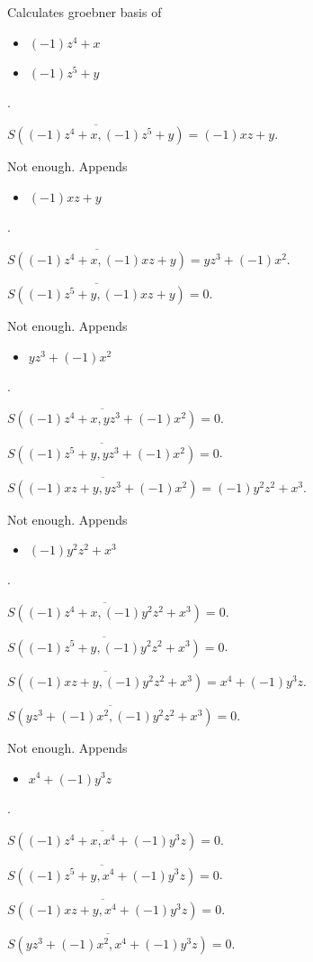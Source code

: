 Calculates groebner basis of 
\begin{itemize}
\item $(-1)z^{4}+x$
\item $(-1)z^{5}+y$
\end{itemize}  .


$\overline{S((-1)z^{4}+x, (-1)z^{5}+y)} = (-1)xz+y$.

Not enough.  Appends \begin{itemize}
\item $(-1)xz+y$
\end{itemize}  .


$\overline{S((-1)z^{4}+x, (-1)xz+y)} = yz^{3}+(-1)x^{2}$.

$\overline{S((-1)z^{5}+y, (-1)xz+y)} = 0$.

Not enough.  Appends \begin{itemize}
\item $yz^{3}+(-1)x^{2}$
\end{itemize}  .


$\overline{S((-1)z^{4}+x, yz^{3}+(-1)x^{2})} = 0$.

$\overline{S((-1)z^{5}+y, yz^{3}+(-1)x^{2})} = 0$.

$\overline{S((-1)xz+y, yz^{3}+(-1)x^{2})} = (-1)y^{2}z^{2}+x^{3}$.

Not enough.  Appends \begin{itemize}
\item $(-1)y^{2}z^{2}+x^{3}$
\end{itemize}  .


$\overline{S((-1)z^{4}+x, (-1)y^{2}z^{2}+x^{3})} = 0$.

$\overline{S((-1)z^{5}+y, (-1)y^{2}z^{2}+x^{3})} = 0$.

$\overline{S((-1)xz+y, (-1)y^{2}z^{2}+x^{3})} = x^{4}+(-1)y^{3}z$.

$\overline{S(yz^{3}+(-1)x^{2}, (-1)y^{2}z^{2}+x^{3})} = 0$.

Not enough.  Appends \begin{itemize}
\item $x^{4}+(-1)y^{3}z$
\end{itemize}  .


$\overline{S((-1)z^{4}+x, x^{4}+(-1)y^{3}z)} = 0$.

$\overline{S((-1)z^{5}+y, x^{4}+(-1)y^{3}z)} = 0$.

$\overline{S((-1)xz+y, x^{4}+(-1)y^{3}z)} = 0$.

$\overline{S(yz^{3}+(-1)x^{2}, x^{4}+(-1)y^{3}z)} = 0$.

